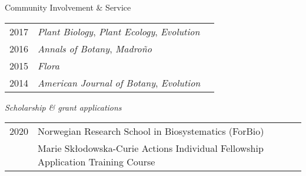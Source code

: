 \documentclass[11pt]{article}
\begin{document}
\begin{rSection}{Community Involvement \& Service}
\begin{tabular}{llr}
2017 & \textit{Plant Biology}, \textit{Plant Ecology}, \textit{Evolution}\\

2016 & \textit{Annals of Botany}, \textit{Madro{\~n}o} \\

2015 & \textit{Flora}\\
2014 & \textit{American Journal of Botany}, \textit{Evolution}
\end{tabular}

\par

\vspace{1em }

\noindent \textit{Scholarship \& grant applications}

\vspace{0.5em}

\begin{tabular}{llr}
2020 & Norwegian Research School in Biosystematics (ForBio) \\ 
& Marie Skłodowska-Curie Actions Individual Fellowship Application Training Course


\end{tabular}


\end{rSection}
\end{document}

